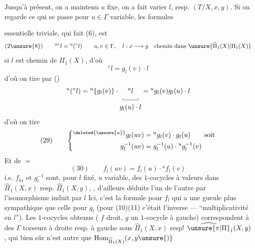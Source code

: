 Jusqu'à présent, on a maintenu $u$ fixe, on a fait varier $l$, resp. $(T/X,x,y)$. Si on regarde ce qui se passe pour $u\in\Gamma$ variable, les formules

essentielle triviale, qui fait   (6), est
\[
(2\unsure{8})\qquad {}^{uv}l={}^u({}^vl)
\qquad u,v\in\Gamma,\quad l:x\longrightarrow y
\quad\text{chemin dans }\unsure{\widehat{\Pi}_1(X)|\Pi_1(X)}
\]
 si $l$ est chemin de $\Pi_1(X)$, d'où
\[
{}^vl=g_l(v)\cdot l
\]
 d'où on tire par ()
\[
{}^u({}^vl)={}^u\{g_l(v)\}\cdot \underset{\begin{gathered}
\rule{0.35pt}{3pt}\rule{2.2em}{0.35pt}\rule{0.35pt}{3pt}\\[-2pt]
g_l(u)\cdot l
\end{gathered}}{{}^ul}={}^ug_l(v)g_l(u)\cdot l
\]
d'où on tire
\[
(29)\qquad\left\{\begin{aligned}
{}^{\deleted{\unsure{u}}}g_l(uv)&={}^ug_l(v)\cdot g_l(u)\qquad\text{soit}\\
g_l^{-1}(uv)&=g_l^{-1}(u)\cdot{}^ug_l^{-1}(v)
\end{aligned}\right.
\]
Et de $=$
\[
(30)\qquad f_l(uv)=f_l(u)\cdot{}^uf_l(v)
\]
i.e. $f_{l\alpha}$ et $g_l^{-1}$ sont, pour $l$ fixé, $u$ variable, des $1$-cocycles  à valeurs dans $\widehat{\Pi}_1(X,x)$ resp. $\widehat{\Pi}_1(X,y)$, , d'ailleurs déduits l'un de l'autre par l'isomorphisme
induit par $l$  Ici, c'est la formule pour $f_l$ qui a une gueule plus sympathique que celle pour $g_l$ (pour (10)(11) c'était l'inverse ---  ``multiplicativité en $l$''). Les $1$-cocycles obtenus ( $f$  droit, $g$ un $1$-cocycle à gauche) correspondent à des $\Gamma$ torseurs à droite resp. à gauche sous $\widehat{\Pi}_1(X,x)$ resp! $\widehat{\unsure{\pi|\Pi}}_1(X,y)$, qui bien sûr n'est autre que $\operatorname{Hom}_{\widehat{\Pi}_1(X)}(x,y\unsure{)}$


